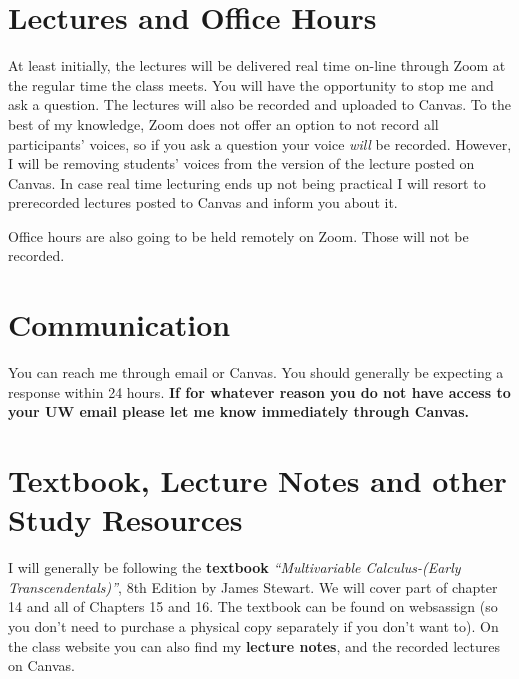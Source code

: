 \documentclass[11pt]{article}
\begin{document}


\section*{Lectures and Office Hours}

At least initially, the lectures will be delivered real time on-line through Zoom at the regular time the class meets.
You will have the opportunity to stop me and ask a question.
The lectures will also be recorded and uploaded to Canvas. 
To the best of my knowledge, Zoom does not offer an option to not record all participants' voices, so if you ask a question your voice \textit{will} be recorded. 
However, I will be removing students' voices from the version of the lecture posted on Canvas.
In case real time lecturing ends up not being practical I will resort to prerecorded lectures posted to Canvas and inform you about it.

\medskip

\noindent Office hours are also going to be held remotely on Zoom. Those will not be recorded.

\section*{Communication}

You can reach me through email or Canvas.
You should generally be expecting a response within 24 hours.
\textbf{If for whatever reason you do not have access to your UW email please let me know immediately through Canvas.}


\section*{Textbook, Lecture Notes and other Study Resources}


I will generally be following the \textbf{textbook} \emph{``Multivariable Calculus-(Early Transcendentals)''}, 8th Edition by James Stewart. We will cover part of chapter 14 and all of Chapters 15 and 16. The textbook can be found on websassign (so you don't need to purchase a physical copy separately if you don't want to).
 On the class website you can also find my \textbf{lecture notes},
and the recorded lectures on Canvas.
\end{document}
